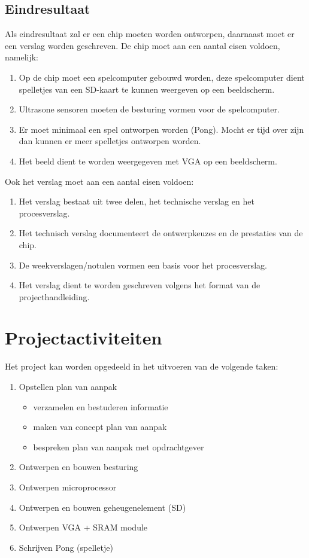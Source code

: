 \documentclass[oneside,dutch]{tudelft-report}
\begin{document}
\subsection{Eindresultaat}
Als eindresultaat zal er een chip moeten worden ontworpen, daarnaast moet er een verslag worden geschreven.
De chip moet aan een aantal eisen voldoen, namelijk:
\begin{enumerate}
\item Op de chip moet een spelcomputer gebouwd worden, deze spelcomputer dient spelletjes van een SD-kaart te kunnen weergeven op een beeldscherm.
\item Ultrasone sensoren moeten de besturing vormen voor de spelcomputer.
\item Er moet minimaal een spel ontworpen worden (Pong). Mocht er tijd over zijn dan kunnen er meer spelletjes ontworpen worden.
\item Het beeld dient te worden weergegeven met VGA op een beeldscherm.
\end{enumerate}
Ook het verslag moet aan een aantal eisen voldoen:
\begin{enumerate}
\item Het verslag bestaat uit twee delen, het technische verslag en het procesverslag.
\item Het technisch verslag documenteert de ontwerpkeuzes en de prestaties van de chip.
\item De weekverslagen/notulen vormen een basis voor het procesverslag.
\item Het verslag dient te worden geschreven volgens het format van de projecthandleiding.
\end{enumerate}

\section{Projectactiviteiten}
Het project kan worden opgedeeld in het uitvoeren van de volgende taken:
\begin{enumerate}
\item Opstellen plan van aanpak
\begin{itemize}
\item verzamelen en bestuderen informatie
\item maken van concept plan van aanpak
\item bespreken plan van aanpak met opdrachtgever
\end{itemize}
\item Ontwerpen en bouwen besturing
\item Ontwerpen microprocessor
\item Ontwerpen en bouwen geheugenelement (SD)
\item Ontwerpen VGA + SRAM module
\item Schrijven Pong (spelletje)
\end{enumerate}
\end{document}
